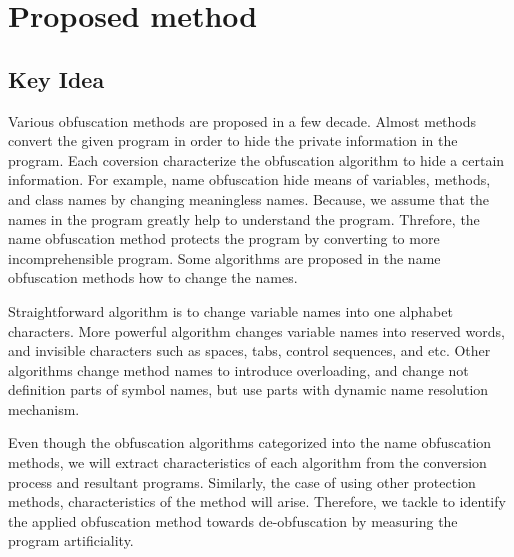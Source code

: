 \documentclass[conference]{IEEEtran}
\begin{document}
\section{Proposed method}\label{sect:method}

\subsection{Key Idea}

Various obfuscation methods are proposed in a few decade.  Almost
methods convert the given program in order to hide the private
information in the program.  Each coversion characterize the
obfuscation algorithm to hide a certain information.
%
For example, name obfuscation hide means of variables, methods, and
class names by changing meaningless names\cite{tyma00patent}.
Because, we assume that the names in the program greatly help to
understand the program.  Threfore, the name obfuscation method
protects the program by converting to more incomprehensible program.
Some algorithms are proposed in the name obfuscation methods how to
change the names.

Straightforward algorithm is to change variable names into one
alphabet characters.  More powerful algorithm changes variable names
into reserved words, and invisible characters such as spaces, tabs,
control sequences, and etc\cite{dasho}.  Other algorithms change
method names to introduce overloading\cite{tyma00patent}, and change
not definition parts of symbol names, but use parts with dynamic name
resolution mechanism\cite{tamada07ieice,tamada08iasted}.

Even though the obfuscation algorithms categorized into the name
obfuscation methods, we will extract characteristics of each algorithm
from the conversion process and resultant programs.
%
Similarly, the case of using other protection methods, characteristics
of the method will arise.  Therefore, we tackle to identify the
applied obfuscation method towards de-obfuscation by measuring the
program artificiality.
\end{document}
